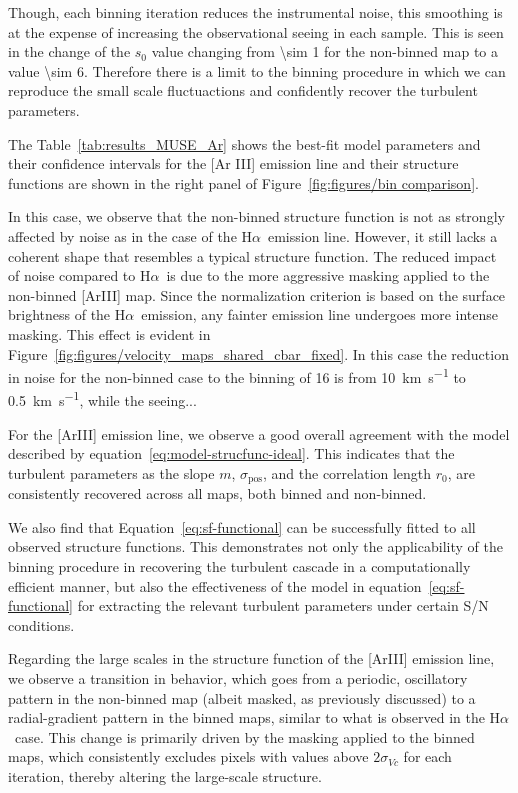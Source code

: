 \documentclass[fleqn,usenatbib, useAMS, a4paper]{mnras}
\newcommand\pos{\ensuremath{_{\mathrm{pos}}}}
\newcommand\halpha{H${\alpha}$}
\begin{document}
Though, each binning iteration reduces the instrumental noise, this smoothing is at the expense of increasing the observational seeing in each sample. 
This is seen in the change of the $s_0$ value changing from \SI{\sim 1}{} for the non-binned map to a value \SI{\sim 6}{}.
Therefore there is a limit to the binning procedure in which we can reproduce the small scale fluctuactions and confidently recover the turbulent parameters.

The Table~\ref{tab:results_MUSE_Ar} shows the best-fit model parameters and their confidence intervals for the [Ar III] emission line and their structure functions are shown in the right panel of Figure~\ref{fig:figures/bin comparison}.

In this case, we observe that the non-binned structure function is not as strongly affected by noise as in the case of the \halpha\ emission line. 
However, it still lacks a coherent shape that resembles a typical structure function.  
The reduced impact of noise compared to \halpha\ is due to the more aggressive masking applied to the non-binned [ArIII] map.  
Since the normalization criterion is based on the surface brightness of the \halpha\ emission, any fainter emission line undergoes more intense masking. 
This effect is evident in Figure~\ref{fig:figures/velocity_maps_shared_cbar_fixed}.
In this case the reduction in noise for the non-binned case to the binning of \num{16} is from \SI{10}{km.s^{-1}} to \SI{0.5}{km.s^{-1}}, while the seeing...

For the [ArIII] emission line, we observe a good overall agreement with the model described by equation~\eqref{eq:model-strucfunc-ideal}.  
This indicates that the turbulent parameters as the slope \(m\), \(\sigma\)\pos, and the correlation length \(r_0\), are consistently recovered across all maps, both binned and non-binned.

We also find that Equation~\eqref{eq:sf-functional} can be successfully fitted to all observed structure functions.  
This demonstrates not only the applicability of the binning procedure in recovering the turbulent cascade in a computationally efficient manner, but also the effectiveness of the model in equation~\eqref{eq:sf-functional} for extracting the relevant turbulent parameters under certain S/N conditions.

Regarding the large scales in the structure function of the [ArIII] emission line, we observe a transition in behavior, which goes from a periodic, oscillatory pattern in the non-binned map (albeit masked, as previously discussed) to a radial-gradient pattern in the binned maps, similar to what is observed in the \halpha\ case.  
This change is primarily driven by the masking applied to the binned maps, which consistently excludes pixels with values above \(2\sigma_{Vc}\) for each iteration, thereby altering the large-scale structure.  
\end{document}
